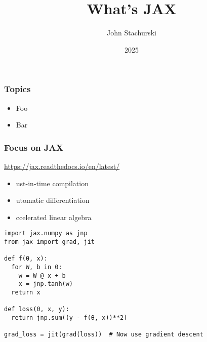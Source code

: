 

\title{What's JAX}



\author{John Stachurski}


\date{2025}




\begin{frame}
  \titlepage
\end{frame}



\begin{frame}
    \frametitle{Topics}

    \begin{itemize}
        \item Foo
        \vspace{0.5em}
        \item Bar
        \vspace{0.5em}
    \end{itemize}

\end{frame}



    

\begin{frame}
    \frametitle{Focus on JAX}

    \url{https://jax.readthedocs.io/en/latest/}
    
            \vspace{0.5em}
    \begin{itemize}
        \item {}ust-in-time compilation
            \vspace{0.5em}
        \item {}utomatic differentiation
            \vspace{0.5em}
        \item {}ccelerated linear algebra
    \end{itemize}

            \vspace{0.5em}
            \vspace{0.5em}

\end{frame}



\begin{frame}[fragile]
    
    \vspace{-1em}
    \begin{verbatim}
import jax.numpy as jnp
from jax import grad, jit

def f(θ, x):
  for W, b in θ:
    w = W @ x + b
    x = jnp.tanh(w)  
  return x

def loss(θ, x, y):
  return jnp.sum((y - f(θ, x))**2)

grad_loss = jit(grad(loss))  # Now use gradient descent 
    \end{verbatim}

\end{frame}


